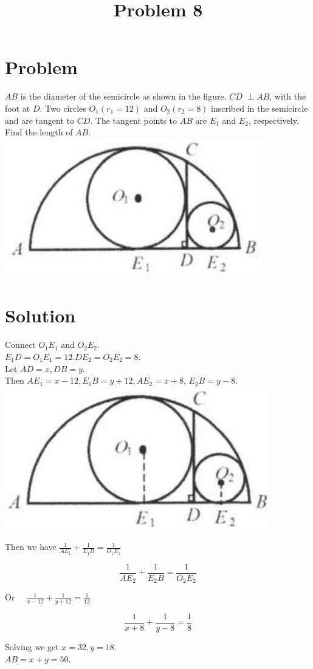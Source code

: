 \documentclass{article}
\title{Problem 8}
\date{}
\begin{document}
\maketitle

\section*{Problem}
\(A B\) is the diameter of the semicircle as shown in the figure. \(C D\) \(\perp A B\), with the foot at \(D\). Two circles \(O_{1}\left(r_{1}=12\right)\) and \(O_{2}\left(r_{2}=8\right)\) inscribed in the semicircle and are tangent to \(C D\). The tangent points to \(A B\) are \(E_{1}\) and \(E_{2}\), respectively. Find the length of \(A B\).\\
\centering
\includegraphics[width=\textwidth]{images/problem_image_1.jpg}

\section*{Solution}
Connect \(O_{1} E_{1}\) and \(O_{2} E_{2}\).\\
\(E_{1} D=O_{1} E_{1}=12 . D E_{2}=O_{2} E_{2}=8\).\\
Let \(A D=x, D B=y\).\\
Then \(A E_{1}=x-12, E_{1} B=y+12, A E_{2}=x+8\), \(E_{2} B=y-8\).\\
\centering
\includegraphics[width=\textwidth]{images/reasoning_image_1.jpg}

Then we have \(\frac{1}{A E_{1}}+\frac{1}{E_{1} B}=\frac{1}{O_{1} E_{1}}\)

\[
\frac{1}{A E_{2}}+\frac{1}{E_{2} B}=\frac{1}{O_{2} E_{2}}
\]

Or \(\quad \frac{1}{x-12}+\frac{1}{y+12}=\frac{1}{12}\)

\[
\frac{1}{x+8}+\frac{1}{y-8}=\frac{1}{8}
\]

Solving we get \(x=32, y=18\).\\
\(A B=x+y=50\).
\end{document}

